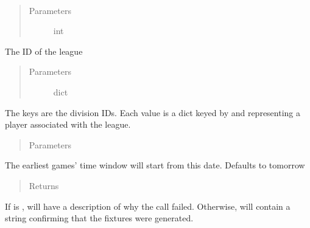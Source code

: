 \documentclass[letterpaper,10pt,english]{sphinxmanual}
\begin{document}
\begin{fulllineitems}
\label{\detokenize{tiger_leagues/models/readme:tiger_leagues.models.admin_model.generate_league_fixtures}}~\begin{quote}\begin{description}
\item[{Parameters}] \leavevmode
{} \textendash{} int

\end{description}\end{quote}

The ID of the league
\begin{quote}\begin{description}
\item[{Parameters}] \leavevmode
{} \textendash{} dict

\end{description}\end{quote}

The keys are the division IDs. Each value is a dict keyed by  and 
 representing a player associated with the league.
\begin{quote}\begin{description}
\item[{Parameters}] \leavevmode
{} \textendash{} 

\end{description}\end{quote}

The earliest games’ time window will start from this date. Defaults to 
tomorrow
\begin{quote}\begin{description}
\item[{Returns}] \leavevmode
{}

\end{description}\end{quote}

If  is ,  will have a description of why the 
call failed. Otherwise,  will contain a string confirming that 
the fixtures were generated.

\end{fulllineitems}
\end{document}
